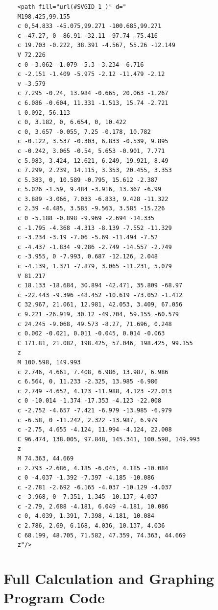 \documentclass[letterpaper, 12pt]{article}
\begin{document}
\begin{verbatim}
    <path fill="url(#SVGID_1_)" d="
    M198.425,99.155
    c 0,54.833 -45.075,99.271 -100.685,99.271
    c -47.27, 0 -86.91 -32.11 -97.74 -75.416
    c 19.703 -0.222, 38.391 -4.567, 55.26 -12.149
    V 72.226
    c 0 -3.062 -1.079 -5.3 -3.234 -6.716
    c -2.151 -1.409 -5.975 -2.12 -11.479 -2.12
    v -3.579
    c 7.295 -0.24, 13.984 -0.665, 20.063 -1.267
    c 6.086 -0.604, 11.331 -1.513, 15.74 -2.721
    l 0.092, 56.113
    c 0, 3.182, 0, 6.654, 0, 10.422
    c 0, 3.657 -0.055, 7.25 -0.178, 10.782
    c -0.122, 3.537 -0.303, 6.833 -0.539, 9.895
    c -0.242, 3.065 -0.54, 5.653 -0.901, 7.771
    c 5.983, 3.424, 12.621, 6.249, 19.921, 8.49
    c 7.299, 2.239, 14.115, 3.353, 20.455, 3.353
    c 5.383, 0, 10.589 -0.795, 15.612 -2.387
    c 5.026 -1.59, 9.484 -3.916, 13.367 -6.99
    c 3.889 -3.066, 7.033 -6.833, 9.428 -11.322
    c 2.39 -4.485, 3.585 -9.563, 3.585 -15.226
    c 0 -5.188 -0.898 -9.969 -2.694 -14.335
    c -1.795 -4.368 -4.313 -8.139 -7.552 -11.329
    c -3.234 -3.19 -7.06 -5.69 -11.494 -7.52
    c -4.437 -1.834 -9.286 -2.749 -14.557 -2.749
    c -3.955, 0 -7.993, 0.687 -12.126, 2.048
    c -4.139, 1.371 -7.879, 3.065 -11.231, 5.079
    V 81.217
    c 18.133 -18.684, 30.894 -42.471, 35.809 -68.97
    c -22.443 -9.396 -48.452 -10.619 -73.052 -1.412
    C 32.967, 21.061, 12.981, 42.053, 3.409, 67.056
    c 9.221 -26.919, 30.12 -49.704, 59.155 -60.579
    c 24.245 -9.068, 49.573 -8.27, 71.696, 0.248
    c 0.002 -0.021, 0.011 -0.045, 0.014 -0.063
    C 171.81, 21.082, 198.425, 57.046, 198.425, 99.155
    z 
    M 100.598, 149.993
    c 2.746, 4.661, 7.408, 6.986, 13.987, 6.986
    c 6.564, 0, 11.233 -2.325, 13.985 -6.986
    c 2.749 -4.652, 4.123 -11.988, 4.123 -22.013
    c 0 -10.014 -1.374 -17.353 -4.123 -22.008
    c -2.752 -4.657 -7.421 -6.979 -13.985 -6.979
    c -6.58, 0 -11.242, 2.322 -13.987, 6.979
    c -2.75, 4.655 -4.124, 11.994 -4.124, 22.008
    C 96.474, 138.005, 97.848, 145.341, 100.598, 149.993
    z 
    M 74.363, 44.669
    c 2.793 -2.686, 4.185 -6.045, 4.185 -10.084
    c 0 -4.037 -1.392 -7.397 -4.185 -10.086
    c -2.781 -2.692 -6.165 -4.037 -10.129 -4.037
    c -3.968, 0 -7.351, 1.345 -10.137, 4.037
    c -2.79, 2.688 -4.181, 6.049 -4.181, 10.086
    c 0, 4.039, 1.391, 7.398, 4.181, 10.084
    c 2.786, 2.69, 6.168, 4.036, 10.137, 4.036
    C 68.199, 48.705, 71.582, 47.359, 74.363, 44.669
    z"/>
\end{verbatim}

\section{Full Calculation and Graphing Program Code}




\end{document}

